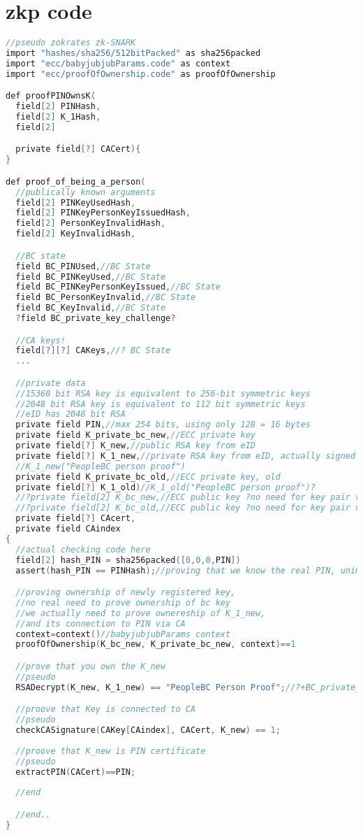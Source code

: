\documentclass{article}
\begin{document}
\section{zkp code}
\begin{lstlisting}[language=C, frame=single, style=b]
//pseudo zokrates zk-SNARK
import "hashes/sha256/512bitPacked" as sha256packed
import "ecc/babyjubjubParams.code" as context
import "ecc/proofOfOwnership.code" as proofOfOwnership

def proofPINOwnsK(
  field[2] PINHash,
  field[2] K_1Hash,
  field[2] 

  private field[?] CACert){
}

def proof_of_being_a_person(
  //publically known arguments
  field[2] PINKeyUsedHash,
  field[2] PINKeyPersonKeyIssuedHash,
  field[2] PersonKeyInvalidHash,
  field[2] KeyInvalidHash,

  //BC state
  field BC_PINUsed,//BC State
  field BC_PINKeyUsed,//BC State
  field BC_PINKeyPersonKeyIssued,//BC State
  field BC_PersonKeyInvalid,//BC State
  field BC_KeyInvalid,//BC State
  ?field BC_private_key_challenge?

  //CA keys!
  field[?][?] CAKeys,//? BC State
  ...

  //private data
  //15360 bit RSA key is equivalent to 256-bit symmetric keys
  //2048 bit RSA key is equivalent to 112 bit symmetric keys
  //eID has 2048 bit RSA
  private field PIN,//max 254 bits, using only 128 = 16 bytes
  private field K_private_bc_new,//ECC private key
  private field[?] K_new,//public RSA key from eID
  private field[?] K_1_new,//private RSA key from eID, actually signed message
  //K_1_new("PeopleBC person proof")
  private field K_private_bc_old,//ECC private key, old
  private field[?] K_1_old)//K_1_old("PeopleBC person proof")?
  //?private field[2] K_bc_new,//ECC public key ?no need for key pair verification?
  //?private field[2] K_bc_old,//ECC public key ?no need for key pair verification
  private field[?] CAcert,
  private field CAindex
{
  //actual checking code here
  field[2] hash_PIN = sha256packed([0,0,0,PIN])
  assert(hash_PIN == PINHash);//proving that we know the real PIN, unimportant

  //proving ownership of newly registered key, 
  //no real need to prove ownership of bc key
  //we actually need to prove ownereship of K_1_new, 
  //and its connection to PIN via CA
  context=context()//babyjubjubParams context
  proofOfOwnership(K_bc_new, K_private_bc_new, context)==1

  //prove that you own the K_new
  //pseudo
  RSADecrypt(K_new, K_1_new) == "PeopleBC Person Proof";//?+BC_private_key_challenge;

  //proove that Key is connected to CA
  //pseudo
  checkCASignature(CAKey[CAindex], CACert, K_new) == 1;
  
  //proove that K_new is PIN certificate
  //pseudo
  extractPIN(CACert)==PIN;
  
  //end

  //end..
}
\end{lstlisting}
\newpage
\end{document}
